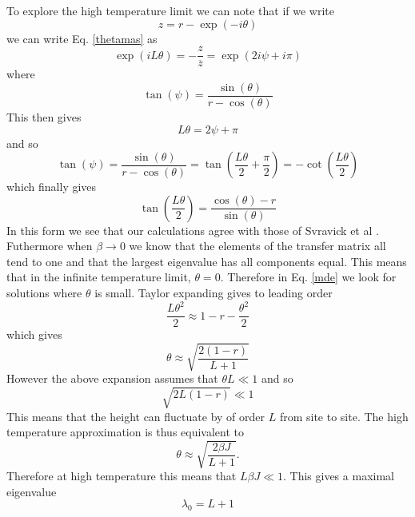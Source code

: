 To explore the high temperature limit we can note that if we write
\begin{equation}
z= r-\exp(-i\theta)
\end{equation}
we can write Eq. \eqref{thetamas} as
\begin{equation}
\exp(i L\theta) = -\frac{z}{\overline z} = \exp(2i\psi + i\pi)
\end{equation}
where
\begin{equation}
\tan(\psi) = \frac{\sin(\theta)}{r-\cos(\theta)}
\end{equation}
This then gives 
\begin{equation}
L \theta = 2\psi + \pi
\end{equation}
and so
\begin{equation}
\tan(\psi) = \frac{\sin(\theta)}{r-\cos(\theta)}= \tan(\frac{L\theta}{2} +\frac{\pi}{2})= - \cot(\frac{L\theta}{2})
\end{equation}
which finally gives
\begin{equation}
\tan(\frac{L\theta}{2}) = \frac{\cos(\theta)-r}{\sin(\theta)}
\label{mde}
\end{equation}
In this form we see that our calculations agree with those of Svravick et al \cite{svrakic_finite-size_1988}. Futhermore when $\beta\to 0$ we know that the elements of the transfer matrix all tend to one and that the largest eigenvalue has all components equal. This means that in the infinite temperature limit, $\theta=0$. Therefore in Eq. \eqref{mde} we look for solutions where $\theta$ is small. Taylor expanding gives to leading order
\begin{equation}
\frac{L\theta^2}{2} \approx1-r-\frac{\theta^2}{2}
\end{equation}
which gives
\begin{equation}
\theta \approx \sqrt{\frac{2(1-r)}{L+1}}
\end{equation}
However the above expansion assumes that $\theta L\ll1$ and so
\begin{equation}
\sqrt{2L(1-r)} \ll 1
\end{equation}
This means that the height can fluctuate by of order $L$ from site to site. The high temperature approximation is thus equivalent to
\begin{equation}
\theta \approx \sqrt{\frac{2\beta J}{L+1}}.
\end{equation}
Therefore at high temperature this means that $L \beta J\ll1$. 
This gives a maximal eigenvalue
\begin{equation}
\lambda_0 = L+1
\end{equation}
